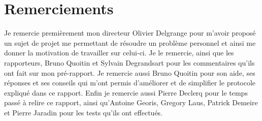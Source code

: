 \documentclass[12pt,a4paper,oneside, titlepage]{report}
\begin{document}
{}


\section*{Remerciements}
\renewcommand{\leftmark}{REMERCIEMENTS}

Je remercie premièrement mon directeur Olivier Delgrange pour m'avoir
proposé un sujet de projet me permettant de résoudre un problème personnel
et ainsi me donner la motivation de travailler sur celui-ci. Je le remercie,
ainsi que les rapporteurs, Bruno Quoitin et Sylvain Degrandsart pour les
commentaires qu'ils ont fait sur mon pré-rapport. Je remercie aussi
Bruno Quoitin pour son aide, ses réponses et ses conseils qui m'ont permis
d'améliorer et de simplifier le protocole expliqué dans ce rapport.
Enfin je remercie aussi Pierre Declerq pour le temps passé à relire
ce rapport, ainsi qu'Antoine Georis, Gregory Laus, Patrick Demeire et Pierre
Jaradin pour les tests qu'ils ont effectués.\\

\newpage
\renewcommand{\leftmark}{TABLE DES MATI\`{E}RES}
\thispagestyle{fancy}
\tableofcontents

\newpage
{}







% 
% 
% 

% 

\printbibliography

\newpage
\appendix
{}

\end{document}

